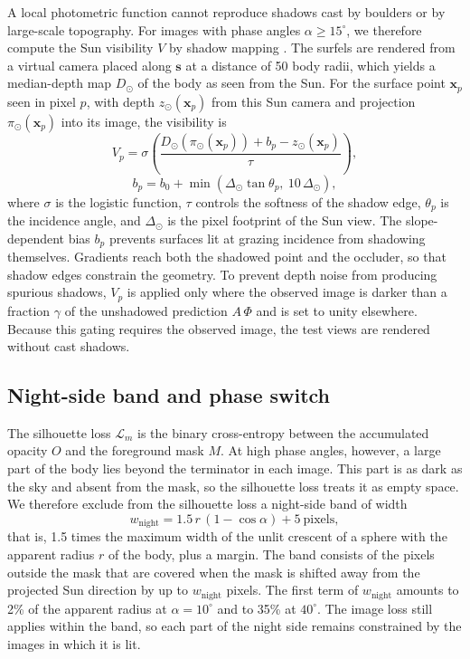 \documentclass[fleqn,usenatbib]{aa}
\newcommand{\vect}[1]{\boldsymbol{#1}}
\begin{document}
A local photometric function cannot reproduce shadows cast by boulders or by large-scale topography. For images with
phase angles $\alpha\geq15^\circ$, we therefore compute the Sun visibility $V$ by shadow mapping \citep{Williams1978}.
The surfels are rendered from a virtual camera placed along $\vect{s}$ at a distance of 50 body radii, which yields a
median-depth map $D_\odot$ of the body as seen from the Sun. For the surface point $\vect{x}_p$ seen in pixel $p$,
with depth $z_\odot(\vect{x}_p)$ from this Sun camera and projection $\pi_\odot(\vect{x}_p)$ into its image, the
visibility is
\begin{equation}
V_p = \sigma\!\left(\frac{D_\odot\!\left(\pi_\odot(\vect{x}_p)\right) + b_p - z_\odot(\vect{x}_p)}{\tau}\right),
\label{eq:shadow}
\end{equation}
\begin{equation}
b_p = b_0 + \min\!\left(\Delta_\odot \tan \theta_p,\ 10\,\Delta_\odot\right),
\label{eq:bias}
\end{equation}
where $\sigma$ is the logistic function, $\tau$ controls the softness of the shadow edge, $\theta_p$ is the incidence
angle, and $\Delta_\odot$ is the pixel footprint of the Sun view. The slope-dependent bias $b_p$ prevents surfaces lit
at grazing incidence from shadowing themselves. Gradients reach both the shadowed point and the occluder, so that
shadow edges constrain the geometry. To prevent depth noise from producing spurious shadows, $V_p$ is applied only
where the observed image is darker than a fraction $\gamma$ of the unshadowed prediction $A\,\Phi$ and is set to unity elsewhere. Because this gating requires the observed image, the test views are rendered without cast shadows.

\subsection{Night-side band and phase switch}
\label{sec:priors}

The silhouette loss $\mathcal{L}_m$ is the binary cross-entropy between the accumulated opacity $O$ and the foreground
mask $M$. At high phase angles, however, a large part of the body lies beyond the terminator in each image. This part
is as dark as the sky and absent from the mask, so the silhouette loss treats it as empty space. We therefore exclude
from the silhouette loss a night-side band of width
\begin{equation}
w_\mathrm{night} = 1.5\,r\,(1-\cos\alpha) + 5~\mathrm{pixels},
\label{eq:night}
\end{equation}
that is, 1.5 times the maximum width of the unlit crescent of a sphere with the apparent radius $r$ of the body, plus a
margin. The band consists of the pixels outside the mask that are covered when the mask is shifted away from the
projected Sun direction by up to $w_\mathrm{night}$ pixels. The first term of $w_\mathrm{night}$ amounts to 2\% of the apparent radius at
$\alpha=10^\circ$ and to 35\% at $40^\circ$. The image loss still applies within the band, so each part of the night
side remains constrained by the images in which it is lit.
\end{document}
